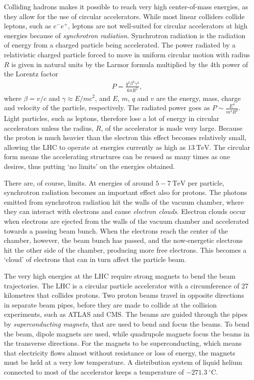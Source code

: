 \documentclass[twoside,english]{uiofysmaster}
\begin{document}
{Colliding hadrons makes it possible to reach very high center-of-mass energies, as they allow for the use of circular accelerators. While most linear colliders collide leptons, such as $e^- e^+$, leptons are not well-suited for circular accelerators at high energies because of \textit{synchrotron radiation}. Synchrotron radiation is the radiation of energy from a charged particle being accelerated. The power radiated by a relativistic charged particle forced to move in uniform circular motion with radius $R$ is given in natural units by the Larmor formula \cite{larmor1897lxiii} multiplied by the 4th power of the Lorentz factor
\begin{align}
P = \frac{q^2 \beta^4 \gamma^4}{6 \pi R^2},
\end{align}
where $\beta = v/c$ and $\gamma \approx E/mc^2$, and $E$, $m$, $q$ and $v$ are the energy, mass, charge and velocity of the particle, respectively. The radiated power goes as $P \sim \frac{E^4}{m^4 R^2}$. Light particles, such as leptons, therefore lose a lot of energy in circular accelerators unless the radius, $R$, of the accelerator is made very large. Because the proton is much heavier than the electron this effect becomes relatively small, allowing the LHC to operate at energies currently as high as $13~\mathrm{TeV}$. The circular form means the accelerating structures can be reused as many times as one desires, thus putting `no limits' on the energies obtained. 

There are, of course, limits. At energies of around $5-7~\mathrm{TeV}$ per particle, synchrotron radiation becomes an important effect also for protons. The photons emitted from synchrotron radiation hit the walls of the vacuum chamber, where they can interact with electrons and cause \textit{electron clouds}. Electron clouds occur when electrons are ejected from the walls of the vacuum chamber and accelerated towards a passing beam bunch. When the electrons reach the center of the chamber, however, the beam bunch has passed, and the now-energetic electrons hit the other side of the chamber, producing more free electrons. This becomes a `cloud' of electrons that can in turn affect the particle beam. 

The very high energies at the LHC require strong magnets to bend the beam trajectories. The LHC is a circular particle accelerator with a circumference of 27 kilometres that collides protons. Two proton beams travel in opposite directions in separate beam pipes, before they are made to collide at the collision experiments, such as ATLAS and CMS. The beams are guided through the pipes by \textit{superconducting magnets}, that are used to bend and focus the beams. To bend the beam, dipole magnets are used, while quadrupole magnets focus the beams in the transverse directions. For the magnets to be superconducting, which means that electricity flows almost without resistance or loss of energy, the magnets must be held at a very low temperature. A distribution system of liquid helium connected to most of the accelerator keeps a temperature of $-271.3~ ^{\circ}\mathrm{C}$. 

}
\end{document}
